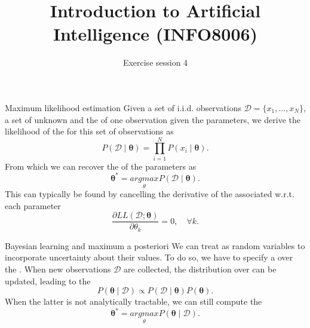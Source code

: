 \documentclass[11pt, a4paper]{article}
\title{Introduction to Artificial Intelligence (INFO8006)}
\subtitle{Exercise session 4}
\begin{document}
\def\var{\text{$\sigma^2$}}

\maketitle

    

\begin{thbox}{Maximum likelihood estimation}
    Given a set of i.i.d. observations $\mathcal{D} = \{x_1,...,x_N\}$, a set of unknown 
    and the  of one observation given the parameters, we derive the likelihood of the  for this set of observations as
    $$
    P(\mathcal{D}\mid \mathbf{\theta}) = \prod_{i=1}^N P(x_i\mid \mathbf{\theta}).
    $$ 
    From which we can recover the  of the parameters as 
    $$
    \mathbf{\theta^*} = \underset{\theta}{argmax}P(\mathcal{D}\mid \mathbf{\theta}).
    $$
    This can typically be found by cancelling the derivative of the associated  w.r.t. each parameter
    $$
    \dfrac{\partial LL(\mathcal{D}; \mathbf{\theta})}{\partial \theta_k} = 0,\quad \forall k.
    $$
\end{thbox}

\begin{thbox}{Bayesian learning and maximum a posteriori}
    We can treat  as random variables to incorporate uncertainty about their values.
    To do so, we have to specify a  over the .
    When new observations $\mathcal{D}$ are collected, the distribution over  can be updated, leading to the 
    $$
    P(\mathbf{\theta}\mid \mathcal{D}) \propto P(\mathcal{D} \mid \mathbf{\theta})P(\mathbf{\theta}).
    $$
    When the latter is not analytically tractable, we can still compute the 
    $$
    \mathbf{\theta^*} = \underset{\theta}{argmax}P(\mathbf{\theta}\mid \mathcal{D}).
    $$
\end{thbox}

\newpage
\end{document}
